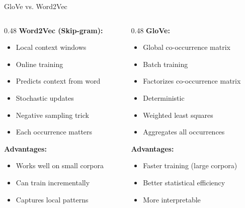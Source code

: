 \documentclass[aspectratio=169]{beamer}
\begin{document}
\begin{frame}[shrink=10]{GloVe vs. Word2Vec 🥊}
\small
\begin{columns}[T]
\begin{column}{0.48\textwidth}
\textbf{Word2Vec (Skip-gram):}
\begin{itemize}\setlength{\itemsep}{0pt}
    \item Local context windows
    \item Online training
    \item Predicts context from word
    \item Stochastic updates
    \item Negative sampling trick
    \item Each occurrence matters
\end{itemize}

\vspace{0.5em}
\textbf{Advantages:}
\begin{itemize}\setlength{\itemsep}{0pt}
    \item Works well on small corpora
    \item Can train incrementally
    \item Captures local patterns
\end{itemize}
\end{column}

\begin{column}{0.48\textwidth}
\textbf{GloVe:}
\begin{itemize}\setlength{\itemsep}{0pt}
    \item Global co-occurrence matrix
    \item Batch training
    \item Factorizes co-occurrence matrix
    \item Deterministic
    \item Weighted least squares
    \item Aggregates all occurrences
\end{itemize}

\vspace{0.5em}
\textbf{Advantages:}
\begin{itemize}\setlength{\itemsep}{0pt}
    \item Faster training (large corpora)
    \item Better statistical efficiency
    \item More interpretable
\end{itemize}
\end{column}
\end{columns}


\end{frame}
\end{document}
